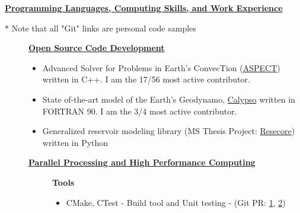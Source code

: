 \documentclass[11pt]{ltxdoc}
\begin{document}
\vskip 18pt

\begin{center}
	\textbf{\underline{Programming Languages, Computing Skills, and Work Experience}}
\end{center}

* Note that all "Git" links are personal code samples 

  \begin{description}
  	
    \item[] \textbf{\underline{Open Source Code Development}}
    
      \begin{itemize}
      	
        \item Advanced Solver for Problems in Earth's ConvecTion (\href{https://github.com/geodynamics/aspect}{ASPECT}) written in C++. I am the 17/56 most active contributor.
      
      \item State of-the-art model of the Earth's Geodynamo,
      \href{https://geodynamics.org/cig/software/calypso/}{Calypso} written in FORTRAN 90. I am the 3/4 most active contributor.
      
      \item Generalized reservoir modeling library (MS Thesis Project: \href{https://github.com/hlokavarapu/resecore.git}{Resecore}) written in Python
            
    \end{itemize}
                                            
    \item[] \textbf{\underline{Parallel Processing and High Performance Computing}}
          
      \vskip 06pt
      
      \begin{description}
    
    	\item[] \textbf{Tools}
     
        \vskip 06pt   
        
        \begin{itemize} 
        
          \item CMake, CTest - Build tool and Unit testing - (Git PR: \href{https://github.com/hlokavarapu/computational_tools/tree/master/ASPECT_build_scripts}{1}, \href{https://github.com/geodynamics/calypso/pull/4}{2})
      

\end{itemize}
\end{description}
\end{description}
\end{document}
